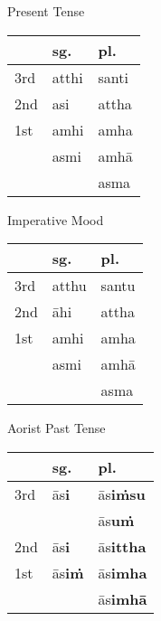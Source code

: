 \documentclass[a4paper]{memoir}
\begin{document}
{\centering\par
\begin{multicols}{3}

Present Tense

\begin{center}
\begin{tabular}{lll}
 & \textbf{sg.} & \textbf{pl.}\\[0pt]
\hline
3rd & atthi & santi\\[0pt]
2nd & asi & attha\\[0pt]
1st & amhi & amha\\[0pt]
 & asmi & amhā\\[0pt]
 &  & asma\\[0pt]
\end{tabular}
\end{center}

\columnbreak

Imperative Mood

\begin{center}
\begin{tabular}{lll}
 & \textbf{sg.} & \textbf{pl.}\\[0pt]
\hline
3rd & atthu & santu\\[0pt]
2nd & āhi & attha\\[0pt]
1st & amhi & amha\\[0pt]
 & asmi & amhā\\[0pt]
 &  & asma\\[0pt]
\end{tabular}
\end{center}

\columnbreak

Aorist Past Tense

\begin{center}
\begin{tabular}{lll}
 & \textbf{sg.} & \textbf{pl.}\\[0pt]
\hline
3rd & ās\textbf{i} & ās\textbf{iṁsu}\\[0pt]
 &  & ās\textbf{uṁ}\\[0pt]
2nd & ās\textbf{i} & ās\textbf{ittha}\\[0pt]
1st & ās\textbf{iṁ} & ās\textbf{imha}\\[0pt]
 &  & ās\textbf{imhā}\\[0pt]
\end{tabular}
\end{center}

\end{multicols}
\par}
\end{document}
